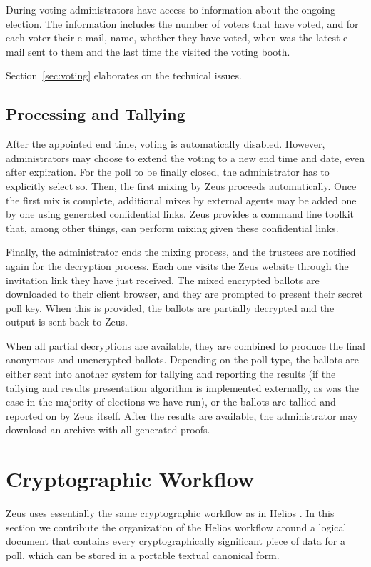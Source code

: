 \documentclass[jets]{usenixjournal}
\begin{document}
During voting administrators have access to information about the
ongoing election. The information includes the number of voters that
have voted, and for each voter their e-mail, name, whether they have
voted, when was the latest e-mail sent to them and the last time the
visited the voting booth.

Section~\ref{sec:voting} elaborates on the technical issues.

\subsection{Processing and Tallying}
After the appointed end time, voting is automatically disabled.
However, administrators may choose to extend the voting to a new end
time and date, even after expiration.
For the poll to be finally closed,
the administrator has to explicitly select so.
Then, the first mixing by Zeus proceeds automatically.
Once the first mix is complete, additional mixes by external agents
may be added one by one using generated confidential links.
Zeus provides a command line toolkit that, among other things, can
perform mixing given these confidential links.

Finally, the administrator ends the mixing process,
and the trustees are notified again for the decryption process.
Each one visits the Zeus website through the invitation link they have
just received.
The mixed encrypted ballots are downloaded to their client browser,
and they are prompted to present their secret poll key.
When this is provided, the ballots are partially decrypted 
and the output is sent back to Zeus.

When all partial decryptions are available, they are combined to produce
the final anonymous and unencrypted ballots.
Depending on the poll type, the ballots are either sent into another
system for tallying and reporting the results (if the tallying
and results presentation algorithm is implemented externally, as was
the case in the majority of elections we have run),
or the ballots are tallied and reported on by Zeus itself.
After the results are available,
the administrator may download an archive with all generated proofs.

\section{Cryptographic Workflow}
\label{sec:crypto_workflow}

Zeus uses essentially the same cryptographic workflow as in Helios
\cite{adida:2008}.
In this section we contribute the organization of the Helios workflow
around a logical document that contains every cryptographically
significant piece of data for a poll,
which can be stored in a portable textual canonical form.
\end{document}
